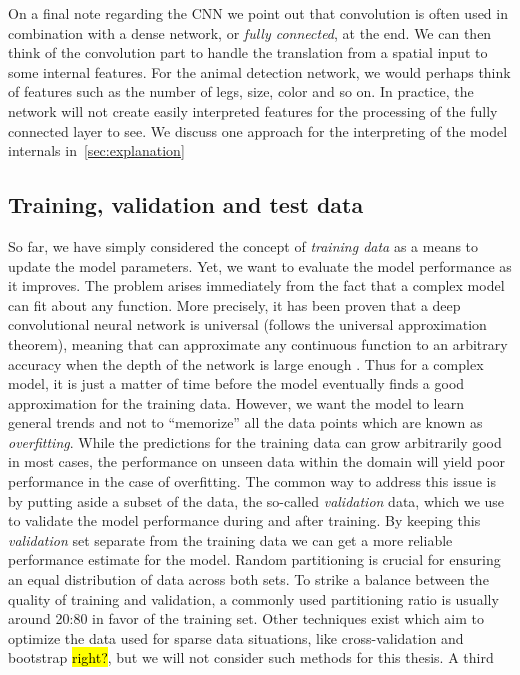 On a final note regarding the \acrshort{CNN} we point out that convolution is often used in combination with a dense network, or \textit{fully connected}, at the end. We can then think of the convolution part to handle the translation from a spatial input to some internal features. For the animal detection network, we would perhaps think of features such as the number of legs, size, color and so on. In practice, the network will not create easily interpreted features for the processing of the fully connected layer to see. We discuss one approach for the interpreting of the model internals in~\cref{sec:explanation}


\subsection{Training, validation and test data}
So far, we have simply considered the concept of \textit{training data} as a means to update the model parameters. Yet, we want to evaluate the model performance as
it improves. The problem arises immediately from the fact that a complex model can fit about any function. More precisely, it has been proven that a deep convolutional neural network is universal (follows the universal approximation theorem), meaning that can approximate any continuous function to an arbitrary accuracy when the depth of the network is large enough \cite{cybenko_approximation_1989}. Thus for a complex model, it is just a matter of time before the model eventually finds a good approximation for the training data. However, we want the model to learn general trends and not to ``memorize'' all the data points which are known as \textit{overfitting}. While the predictions for the training data can grow arbitrarily good in most cases, the performance on unseen data within the domain will yield poor performance in the case of overfitting. The common way to address this issue is by putting aside a subset of the
data, the so-called \textit{validation} data, which we use to validate the model performance during and after training. By keeping this \textit{validation} set separate from the training data we can get a more reliable performance estimate for the model. Random partitioning is crucial for ensuring an equal distribution of data across both sets. To strike a balance between the quality of training and validation, a commonly used partitioning ratio is usually around 20:80 in favor of the training set. Other techniques exist which aim to optimize the
data used for sparse data situations, like cross-validation and bootstrap \hl{right?}, but we will not consider such methods for this thesis. A third
